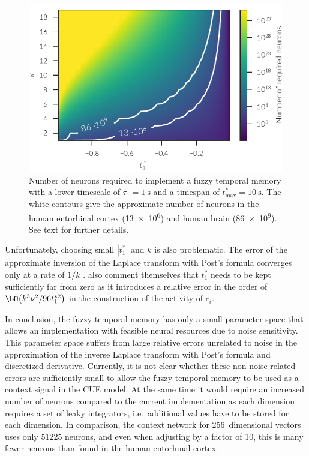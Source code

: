 \begin{figure}
    \centering
    \includegraphics{figures/fuzzy-mem-n-neurons}
    \caption[Number of neurons required to implement a fuzzy temporal memory.]{Number of neurons required to implement a fuzzy temporal memory with a lower timescale of $\tau_1 = \SI{1}{\second}$ and a timespan of $t^*_{\max} = \SI{10}{\second}$. The white contours give the approximate number of neurons in the human entorhinal cortex (\num{13e6}) and human brain (\num{86e9}). See text for further details.}\label{fig:fuzzy-mem-n-neurons}
\end{figure}

Unfortunately, choosing small $|t^*_1|$ and $k$ is also problematic.
The error of the approximate inversion of the Laplace transform with Post's formula converges only at a rate of $1/k$ \parencite{vukimtuan2000}.
\Textcite{shankar2013} also comment themselves that $t^*_1$ needs to be kept sufficiently far from zero as it introduces a relative error in the order of $\bO\big(k^3\nu^2/96 t^{*2}_1\big)$ in the construction of the activity of $c_i$.

In conclusion, the fuzzy temporal memory has only a small parameter space that allows an implementation with feasible neural resources due to noise sensitivity.
This parameter space suffers from large relative errors unrelated to noise in the approximation of the inverse Laplace transform with Post's formula and discretized derivative.
Currently, it is not clear whether these non-noise related errors are sufficiently small to allow the fuzzy temporal memory to be used as a context signal in the CUE model.
At the same time it would require an increased number of neurons compared to the current implementation as each dimension requires a set of leaky integrators, i.e.\ additional values have to be stored for each dimension.
In comparison, the context network for \num{256}~dimensional vectors uses only \num{51225} neurons, and even when adjusting by a factor of \num{10}, this is many fewer neurons than found in the human entorhinal cortex.


